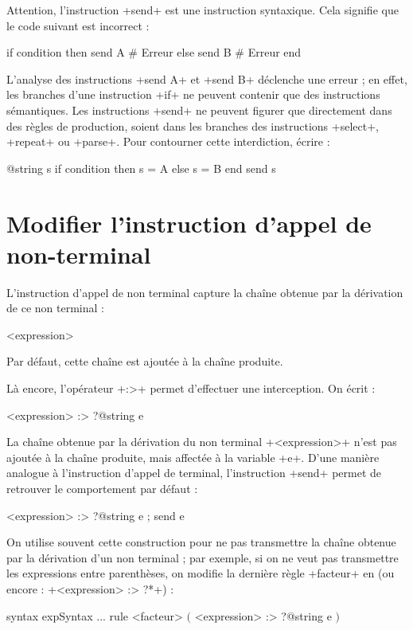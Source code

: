 Attention, l'instruction \ggs+send+ est une instruction syntaxique. Cela signifie que le code suivant est incorrect :

\begin{galgas}
if condition then
  send A # Erreur
else
  send B # Erreur
end
\end{galgas}

L'analyse des instructions \ggs+send A+ et  \ggs+send B+ déclenche une erreur ; en effet, les branches d'une instruction \ggs+if+ ne peuvent contenir que des instructions sémantiques. Les instructions \ggs+send+ ne peuvent figurer que directement dans des règles de production, soient dans les branches des instructions \ggs+select+, \ggs+repeat+ ou \ggs+parse+. Pour contourner cette interdiction, écrire :
\begin{galgas}
@string s
if condition then
  s = A
else
  s = B
end
send s
\end{galgas}



\section{Modifier l'instruction d'appel de non-terminal}

L'instruction d'appel de non terminal capture la chaîne obtenue par la dérivation de ce non terminal :
\begin{galgas}
<expression>
\end{galgas}


Par défaut, cette chaîne est ajoutée à la chaîne produite.

Là encore, l'opérateur \ggs+:>+ permet d'effectuer une interception. On écrit :
\begin{galgas}
<expression> :> ?@string e
\end{galgas}

La chaîne obtenue par la dérivation du non terminal \ggs+<expression>+ n'est pas ajoutée à la chaîne produite, mais affectée à la variable \ggs+e+. D'une manière analogue à l'instruction d'appel de terminal, l'instruction \ggs+send+ permet de retrouver le comportement par défaut :
\begin{galgas}
<expression> :> ?@string e ; send e
\end{galgas}

On utilise souvent cette construction pour ne pas transmettre la chaîne obtenue par la dérivation d'un non terminal ; par exemple, si on ne veut pas transmettre les expressions entre parenthèses, on modifie la dernière règle \ggs+facteur+ en (ou encore : \ggs+<expression> :> ?*+) :
\begin{galgas}
syntax expSyntax {
  ...
  rule <facteur> {
    $($
    <expression> :> ?@string e
    $)$
  }
}
\end{galgas}


